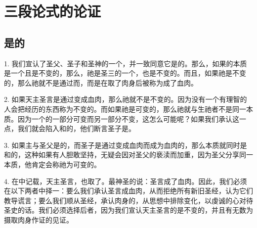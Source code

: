 
\chapter{三段论式的论证}



\section{是的}

1. 我们宣认了圣父、圣子和圣神的一个，并一致同意它是的。那么，如果的本质是一个且是不变的，那么，祂是圣三的一个，也是不变的。而且，如果祂是不变的，那么祂就不是通过而，而是在取了肉身后被称为成了血肉。\par

2. 如果天主圣言是通过变成血肉，那么祂就不是不变的。因为没有一个有理智的人会把经历的东西称为不变的。而如果祂是可变的，那么祂就与生祂者不是同一本质。因为一个的一部分可变而另一部分不变，这怎么可能呢？如果我们承认这一点，我们就会陷入和的，他们断言圣子是。\par

3. 如果主与圣父是的，而圣子是通过变成血肉而成为血肉的，那么本质就同时是和的，这种如果有人胆敢坚持，无疑会因对圣父的亵渎而加重，因为圣父分享同一本质，他肯定会称祂为可变的。\par

4. 在中记载，天主圣言，也取了。最神圣的说：圣言成了血肉。因此，我们必须在以下两者中择一：要么我们承认圣言成血肉，从而拒绝所有新旧圣经，认为它们教导谎言；要么我们顺从圣经，承认肉身的，从思想中排除变化，以虔诚的心对待圣史的话。我们必须选择后者，因为我们宣认天主圣言的是不变的，并且有无数为摄取肉身作证的见证。\par


